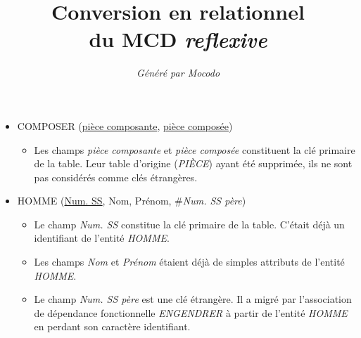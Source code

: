 \documentclass[a4paper]{article}
\title{Conversion en relationnel\\du MCD \emph{reflexive}}
\author{\emph{Généré par Mocodo}}
\newcommand{\relat}[1]{\textsc{#1}}
\newcommand{\attr}[1]{#1}
\newcommand{\prim}[1]{\uline{#1}}
\newcommand{\foreign}[1]{\#\textsl{#1}}
\begin{document}
\maketitle

\begin{itemize}
  \item \relat{COMPOSER} (\prim{pièce composante}, \prim{pièce composée})
  \begin{itemize}
    \item Les champs \emph{pièce composante} et \emph{pièce composée} constituent la clé primaire de la table. Leur table d'origine (\emph{PIÈCE}) ayant été supprimée, ils ne sont pas considérés comme clés étrangères.
  \end{itemize}

  \item \relat{HOMME} (\prim{Num. SS}, \attr{Nom}, \attr{Prénom}, \foreign{Num. SS père})
  \begin{itemize}
    \item Le champ \emph{Num. SS} constitue la clé primaire de la table. C'était déjà un identifiant de l'entité \emph{HOMME}.
    \item Les champs \emph{Nom} et \emph{Prénom} étaient déjà de simples attributs de l'entité \emph{HOMME}.
    \item Le champ \emph{Num. SS père} est une clé étrangère. Il a migré par l'association de dépendance fonctionnelle \emph{ENGENDRER} à partir de l'entité \emph{HOMME} en perdant son caractère identifiant.
  \end{itemize}

\end{itemize}
\end{document}
